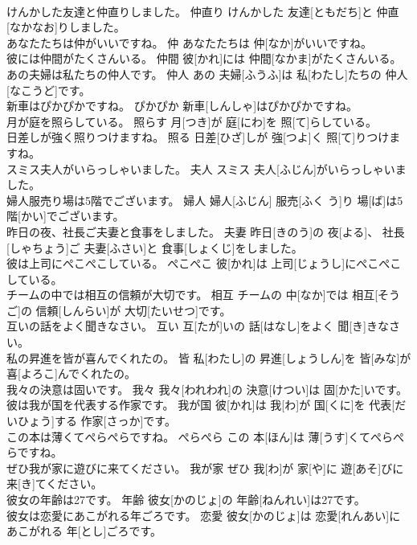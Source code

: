 \documentclass[8pt]{extreport}
\begin{document}
\begin{CJK}{UTF8}{min}
\\	けんかした友達と仲直りしました。	仲直り	けんかした 友達[ともだち]と 仲直[なかなお]りしました。	
\\	あなたたちは仲がいいですね。	仲	あなたたちは 仲[なか]がいいですね。	
\\	彼には仲間がたくさんいる。	仲間	彼[かれ]には 仲間[なかま]がたくさんいる。	
\\	あの夫婦は私たちの仲人です。	仲人	あの 夫婦[ふうふ]は 私[わたし]たちの 仲人[なこうど]です。	
\\	新車はぴかぴかですね。	ぴかぴか	新車[しんしゃ]はぴかぴかですね。	
\\	月が庭を照らしている。	照らす	月[つき]が 庭[にわ]を 照[て]らしている。	
\\	日差しが強く照りつけますね。	照る	日差[ひざ]しが 強[つよ]く 照[て]りつけますね。	
\\	スミス夫人がいらっしゃいました。	夫人	スミス 夫人[ふじん]がいらっしゃいました。	
\\	婦人服売り場は5階でございます。	婦人	婦人[ふじん] 服売[ふく う]り 場[ば]は5 階[かい]でございます。	
\\	昨日の夜、社長ご夫妻と食事をしました。	夫妻	昨日[きのう]の 夜[よる]、 社長[しゃちょう]ご 夫妻[ふさい]と 食事[しょくじ]をしました。	
\\	彼は上司にぺこぺこしている。	ぺこぺこ	彼[かれ]は 上司[じょうし]にぺこぺこしている。	
\\	チームの中では相互の信頼が大切です。	相互	チームの 中[なか]では 相互[そうご]の 信頼[しんらい]が 大切[たいせつ]です。	
\\	互いの話をよく聞きなさい。	互い	互[たが]いの 話[はなし]をよく 聞[き]きなさい。	
\\	私の昇進を皆が喜んでくれたの。	皆	私[わたし]の 昇進[しょうしん]を 皆[みな]が 喜[よろこ]んでくれたの。	
\\	我々の決意は固いです。	我々	我々[われわれ]の 決意[けつい]は 固[かた]いです。	
\\	彼は我が国を代表する作家です。	我が国	彼[かれ]は 我[わ]が 国[くに]を 代表[だいひょう]する 作家[さっか]です。	
\\	この本は薄くてぺらぺらですね。	ぺらぺら	この 本[ほん]は 薄[うす]くてぺらぺらですね。	
\\	ぜひ我が家に遊びに来てください。	我が家	ぜひ 我[わ]が 家[や]に 遊[あそ]びに 来[き]てください。	
\\	彼女の年齢は27です。	年齢	彼女[かのじょ]の 年齢[ねんれい]は27です。	
\\	彼女は恋愛にあこがれる年ごろです。	恋愛	彼女[かのじょ]は 恋愛[れんあい]にあこがれる 年[とし]ごろです。	

\end{CJK}
\end{document}
